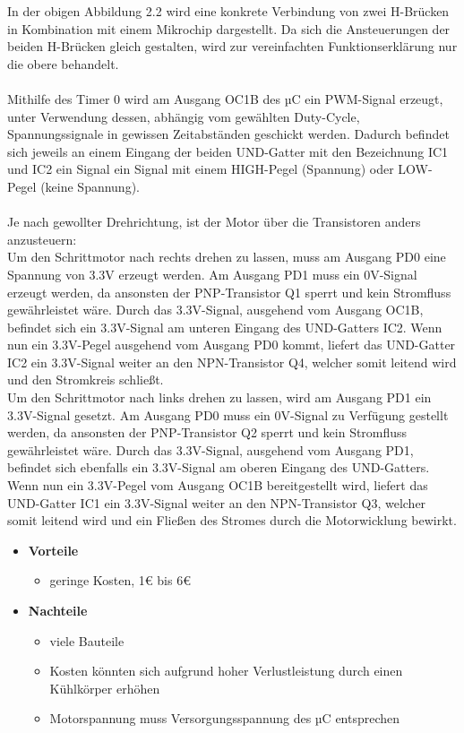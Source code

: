 In der obigen Abbildung 2.2 wird eine konkrete Verbindung von zwei H-Brücken in Kombination mit einem Mikrochip dargestellt.
Da sich die Ansteuerungen der beiden H-Brücken gleich gestalten, wird zur vereinfachten Funktionserklärung nur die obere behandelt. \\\\
Mithilfe des Timer 0 wird am Ausgang OC1B des \acs{µC} ein PWM-Signal erzeugt, unter Verwendung dessen,
abhängig vom gewählten Duty-Cycle, Spannungssignale in gewissen Zeitabständen geschickt werden.
Dadurch befindet sich jeweils an einem Eingang der beiden UND-Gatter mit den Bezeichnung IC1 und IC2 ein Signal ein Signal mit einem HIGH-Pegel (Spannung) oder LOW-Pegel (keine Spannung). \\\\
Je nach gewollter Drehrichtung, ist der Motor über die Transistoren anders anzusteuern: \\
Um den Schrittmotor nach rechts drehen zu lassen, muss am Ausgang PD0 eine Spannung von 3.3V erzeugt werden.
Am Ausgang PD1 muss ein 0V-Signal erzeugt werden, da ansonsten der PNP-Transistor Q1 sperrt und kein Stromfluss gewährleistet wäre.
Durch das 3.3V-Signal, ausgehend vom Ausgang OC1B, befindet sich ein 3.3V-Signal am unteren Eingang des UND-Gatters IC2.
Wenn nun ein 3.3V-Pegel ausgehend vom Ausgang PD0 kommt, liefert das UND-Gatter IC2 ein 3.3V-Signal weiter an den NPN-Transistor Q4, welcher somit leitend wird und den Stromkreis schließt. \\
Um den Schrittmotor nach links drehen zu lassen, wird am Ausgang PD1 ein 3.3V-Signal gesetzt.
Am Ausgang PD0 muss ein 0V-Signal zu Verfügung gestellt werden, da ansonsten der PNP-Transistor Q2 sperrt und kein Stromfluss gewährleistet wäre.
Durch das 3.3V-Signal, ausgehend vom Ausgang PD1, befindet sich ebenfalls ein 3.3V-Signal am oberen Eingang des UND-Gatters.
Wenn nun ein 3.3V-Pegel vom Ausgang OC1B bereitgestellt wird, liefert das UND-Gatter IC1 ein 3.3V-Signal weiter an den NPN-Transistor Q3, welcher somit leitend wird und
ein Fließen des Stromes durch die Motorwicklung bewirkt.

\begin{itemize}
    \item \textbf{Vorteile}
    \begin{itemize}
        \item geringe Kosten, 1€ bis 6€
    \end{itemize}
    \item \textbf{Nachteile}
    \begin{itemize}
        \item viele Bauteile
        \item Kosten könnten sich aufgrund hoher Verlustleistung durch einen Kühlkörper erhöhen
        \item Motorspannung muss Versorgungsspannung des µC entsprechen
    \end{itemize}
\end{itemize}

